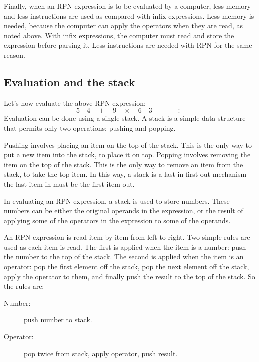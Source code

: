 \documentclass[twocolumn]{iagproc}
\begin{document}
Finally, when an RPN expression is to be evaluated by a computer, less memory and less instructions are used as compared with infix expressions.
Less memory is needed, because the computer can apply the operators when they are read, as noted above.
With infix expressions, the computer must read and store the expression before parsing it.
Less instructions are needed with RPN for the same reason.

\subsection*{Evaluation and the stack}
Let's now evaluate the above RPN expression:
$$ 5 \quad 4 \quad + \quad 9 \quad \times \quad  6 \quad 3 \quad - \quad \div $$
Evaluation can be done using a single stack.
A stack is a simple data structure that permits only two operations: pushing and popping.

Pushing involves placing an item on the top of the stack.
This is the only way to put a new item into the stack, to place it on top.
Popping involves removing the item on the top of the stack.
This is the only way to remove an item from the stack, to take the top item.
In this way, a stack is a last-in-first-out mechanism -- the last item in must be the first item out.

In evaluating an RPN expression, a stack is used to store numbers.
These numbers can be either the original operands in the expression, or the result of applying some of the operators in the expression to some of the operands.

An RPN expression is read item by item from left to right.
Two simple rules are used as each item is read.
The first is applied when the item is a number: push the number to the top of the stack.
The second is applied when the item is an operator: pop the first element off the stack, pop the next element off the stack, apply the operator to them, and finally push the result to the top of the stack.
So the rules are:
\begin{description}
  \item[Number:] push number to stack.
  \item[Operator:] pop twice from stack, apply operator, push result.
\end{description}
\end{document}
